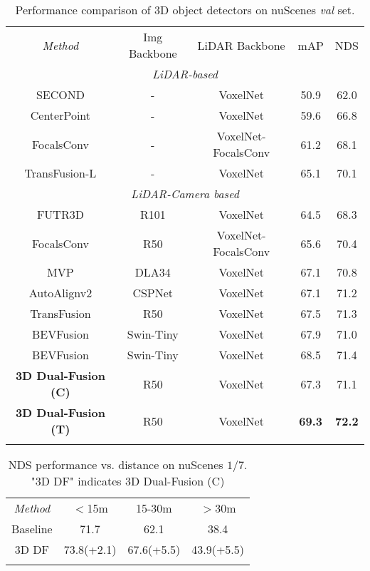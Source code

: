 \documentclass[lettersize,journal]{IEEEtran}
\begin{document}
\begin{table*}[htb]

\renewcommand{\arraystretch}{1.0}
\centering
\caption{Performance comparison of 3D object detectors on nuScenes \textit{val} set. }
\begin{tabular}{ccccc}
\cline{1-5}
\textit{Method} &Img Backbone & LiDAR Backbone  & mAP  & NDS \\
\cline{1-5}                                                         
\multicolumn{5}{c}{\textit{LiDAR-based}}  \\
\cline{1-5}                 
SECOND\cite{second}   & - & VoxelNet  & 50.9  & 62.0  \\
CenterPoint\cite{centerpoint}   & - & VoxelNet  & 59.6  & 66.8  \\
FocalsConv \cite{focalsconv} & - & VoxelNet-FocalsConv & 61.2 & 68.1 \\
TransFusion-L\cite{transfusion}   & - & VoxelNet  & 65.1  & 70.1 
\\

\cline{1-5}               
\multicolumn{5}{c}{\textit{LiDAR-Camera based}}  \\
\cline{1-5}            
FUTR3D\cite{futr3d}   & R101 & VoxelNet  & 64.5  & 68.3  \\
FocalsConv \cite{focalsconv} & R50 & VoxelNet-FocalsConv & 65.6 & 70.4 \\
MVP\cite{mvp}   & DLA34 & VoxelNet  & 67.1  & 70.8  \\
AutoAlignv2\cite{autoalignv2}   & CSPNet & VoxelNet  & 67.1  & 71.2  \\
TransFusion\cite{transfusion}   & R50 & VoxelNet  & 67.5  & 71.3  \\
BEVFusion\cite{bevfusion}   & Swin-Tiny & VoxelNet  & 67.9  & 71.0  \\
BEVFusion\cite{bevfusion2}   & Swin-Tiny & VoxelNet  & 68.5  & 71.4  \\
\cline{1-5}
\textbf{3D Dual-Fusion (C)}      & R50 & VoxelNet  & 67.3  & 71.1  \\
\textbf{3D Dual-Fusion (T)}      & R50 & VoxelNet  & \textbf{69.3}  & \textbf{72.2}  \\
\cline{1-5}
\label{table:nus_val}
\end{tabular}
\end{table*}
 
\begin{table}[t]
\centering
\caption{NDS performance vs. distance on nuScenes $1/7$. "3D DF" indicates 3D Dual-Fusion (C)}
\begin{tabular}{cccc}
\cline{1-4}
\cline{2-4}
\textit{Method} & ${<}$15m  & 15-30m      & ${>}$30m  \\\cline{1-4}
Baseline\cite{centerpoint}& 71.7 & 62.1 & 38.4 \\3D DF& 73.8(+2.1) & 67.6(+5.5) & 43.9(+5.5)\\

\cline{1-4}
\label{table:abl_nus_dist}

\end{tabular}
\end{table}
\end{document}
